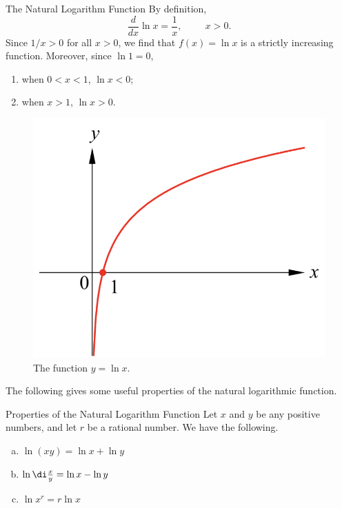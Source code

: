 \begin{highlight}{The Natural Logarithm Function}
By definition,
\[\frac{d}{dx}\ln x=\frac{1}{x},\hspace{1cm} x>0.\]
Since $1/x>0$ for all $x>0$, we find that $f(x)=\ln x$ is a strictly increasing function. Moreover, since $\ln 1=0$,
\begin{enumerate}[$\bullet$\;\;]
\item when $0<x<1$, $\ln x<0$;
\item when $x>1$, $\ln x>0$.
\end{enumerate}
\end{highlight}

\begin{figure}[ht]
\centering
\includegraphics[scale=0.2]{Picture26.png}
\caption{  The function $y=\ln x$.\fa}\label{figure26}
\end{figure}
The following gives some useful properties of the natural logarithmic function.
\begin{proposition}[label=prop230217_5]{Properties of the Natural Logarithm Function}
Let $x$ and $y$ be any positive numbers, and let $r$ be a rational number. We have the following.
\begin{enumerate}[(a)]
\item $\ln (xy)=\ln x+\ln y$
\item $\ln\di \frac{x}{y}=\ln x-\ln y$
\item $\ln x^r=r\ln x$

\end{enumerate}
\end{proposition}
